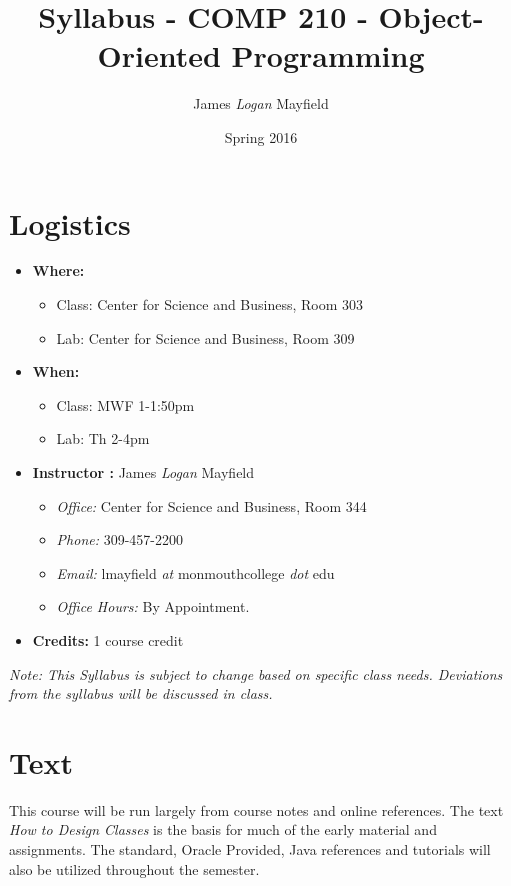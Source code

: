 \documentclass[10pt]{article}
\title{Syllabus - COMP 210 - Object-Oriented Programming}
\author{ James \textit{Logan} Mayfield }
\date{Spring 2016}
\begin{document}
\maketitle

\section{Logistics}
\begin{itemize}
\item \textbf{Where: } 
\begin{itemize}
\item Class: Center for Science and Business, Room 303
\item Lab: Center for Science and Business, Room 309
\end{itemize}
\item \textbf{When: } 
\begin{itemize}
\item Class: MWF 1-1:50pm
\item Lab: Th 2-4pm
\end{itemize}
\item \textbf{Instructor :} James \textit{Logan} Mayfield
\begin{itemize}
\item \textit{Office: } Center for Science and Business, Room 344
\item \textit{Phone: } 309-457-2200
\item \textit{Email: } lmayfield \textit{at} monmouthcollege \textit{dot} edu
\item \textit{Office Hours: } By Appointment.
\end{itemize}
\item \textbf{Credits: } 1 course credit
\end{itemize}
\emph{Note: This Syllabus is subject to change based on specific class needs. Deviations from the syllabus will be discussed in class.}


\section{Text}

This course will be run largely from course notes and online references.  The text \textit{How to Design Classes} is the basis for much of the early material and assignments.  The standard, Oracle Provided, Java references and tutorials will also be utilized throughout the semester.
\vspace{.25in}
\end{document}
